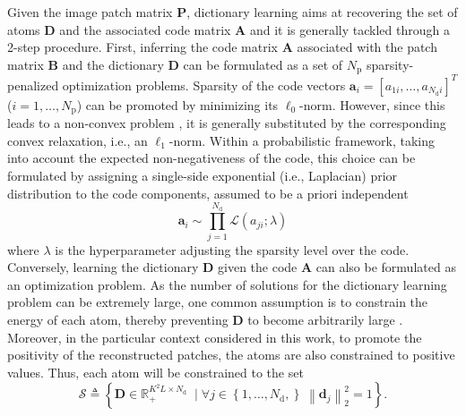 \documentclass[review]{elsarticle}
\newcommand{\Ndim}{L}
\newcommand{\Psize}{K}
\newcommand{\Natom}{N_{\mathrm{d}}}
\newcommand{\Npatch}{N_{\mathrm{p}}}
\begin{document}
Given the image patch matrix $\mathbf{P}$, dictionary learning aims at recovering the set of atoms $\mathbf{D}$ and the associated code matrix $\mathbf{A}$ and it is generally tackled through a 2-step procedure. First, inferring the code matrix $\mathbf{A}$ associated with the patch matrix $\mathbf{B}$ and the dictionary $\mathbf{D}$ can be formulated as a set of $\Npatch$ sparsity-penalized optimization problems. Sparsity of the code vectors $\mathbf{a}_i=\left[a_{1i},\ldots,a_{\Natom i}\right]^T$ ($i=1,\ldots,\Npatch$) can be promoted by minimizing its $\ell_{0}$-norm. However, since this leads to a non-convex problem \citep{chen_atomic_2001}, it is generally substituted by the corresponding convex relaxation, i.e., an $\ell_1$-norm. Within a probabilistic framework, taking into account the expected non-negativeness of the code, this choice can be formulated by assigning a single-side exponential (i.e., Laplacian) prior distribution to the code components, assumed to be a priori independent
 \begin{equation}
	\label{eq:code_model}
	\mathbf{a}_{i} \sim \prod_{j=1}^{\Natom}\mathcal{L}(a_{ji};\lambda)
\end{equation}
where $\lambda$ is the hyperparameter adjusting the sparsity level over the code.
Conversely, learning the dictionary $\mathbf{D}$ given the code $\mathbf{A}$ can also be formulated as an optimization problem. As the number of solutions for the dictionary learning problem can be extremely large, one common assumption is to constrain the energy of each atom, thereby preventing $\mathbf{D}$ to become arbitrarily large \citep{mairal_online_2009}. Moreover, in the particular context considered in this work, to promote the positivity of the reconstructed patches, the atoms are also constrained to positive values. Thus, each atom will be constrained to the set
\begin{equation}\label{eq:dict_dist}
  \mathcal{S} \triangleq \left\{\mathbf{D} \in \mathbb{R}^{\Psize^{2}\Ndim \times \Natom}_{+} \; \mid \forall j \in\left\{ 1,\ldots,\Natom,\right\} \; \left\|\mathbf{d}_j\right\|^2_{2} = 1\right\}.
\end{equation}
\end{document}
